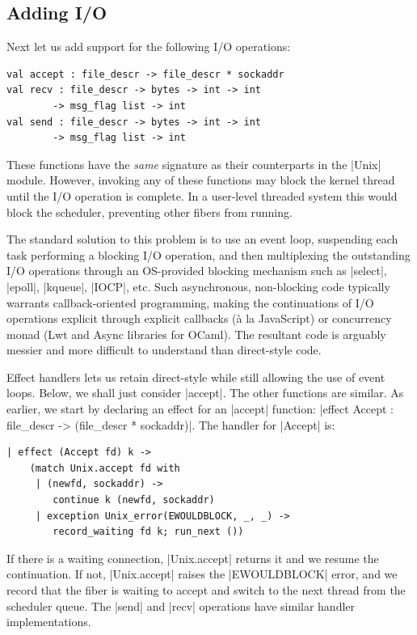 \documentclass{llncs}
\begin{document}
\subsection{Adding I/O}
\label{sec:effect-io}

Next let us add support for the following I/O operations:

\begin{lstlisting}
val accept : file_descr -> file_descr * sockaddr
val recv : file_descr -> bytes -> int -> int
        -> msg_flag list -> int
val send : file_descr -> bytes -> int -> int
        -> msg_flag list -> int
\end{lstlisting}

These functions have the \emph{same} signature as their counterparts in the
|Unix| module. However, invoking any of these functions may block the kernel
thread until the I/O operation is complete. In a user-level threaded system this
would block the scheduler, preventing other fibers from running.

The standard solution to this problem is to use an event loop, suspending each
task performing a blocking I/O operation, and then multiplexing the outstanding I/O
operations through an OS-provided blocking mechanism such as |select|, |epoll|,
|kqueue|, |IOCP|, etc. Such asynchronous, non-blocking code typically warrants
callback-oriented programming, making the continuations of I/O operations
explicit through explicit callbacks (à la JavaScript) or concurrency monad (Lwt
and Async libraries for OCaml). The resultant code is arguably messier and
more difficult to understand than direct-style code.

Effect handlers lets us retain direct-style while still allowing the use of
event loops. Below, we shall just consider |accept|. The
other functions are similar. As earlier, we start by declaring an effect for an
|accept| function: |effect Accept : file_descr -> (file_descr * sockaddr)|. The
handler for |Accept| is:

\begin{lstlisting}
| effect (Accept fd) k ->
    (match Unix.accept fd with
     | (newfd, sockaddr) ->
        continue k (newfd, sockaddr)
     | exception Unix_error(EWOULDBLOCK, _, _) ->
        record_waiting fd k; run_next ())
\end{lstlisting}

If there is a waiting connection, |Unix.accept| returns it and we
resume the continuation. If not, |Unix.accept| raises the
|EWOULDBLOCK| error, and we record that the fiber is waiting to accept
and switch to the next thread from the scheduler queue. The
|send| and |recv| operations have similar handler implementations.
\end{document}
